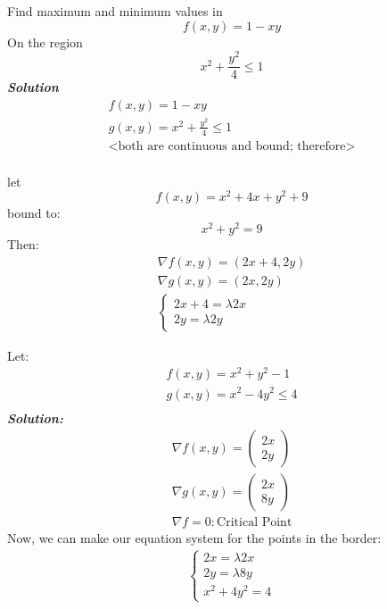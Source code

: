 \documentclass[11pt,fleqn]{book} %
\begin{document}
\begin{example}
    Find maximum and minimum values in $$f(x,y) = 1 - xy$$
    On the region $$x^2 + \frac{y^2}{4} \leq 1$$
    \textbf{\textit{Solution}}
    \begin{gather}
        f(x,y) = 1 - xy \\
        g(x,y) = x^2 + \frac{y^2}{4} \leq 1\\
        \text{<both are continuous and bound; therefore>}\\    
    \end{gather}
\end{example}
\begin{example}
    let $$f(x,y) = x^2 +4x +y^2 +9$$ bound to:
    $$x^2 + y^2 = 9$$
    Then:
    \begin{gather}
        \nabla f(x,y) = (2x+4, 2y)\\
        \nabla g(x,y) = (2x,2y)\\
        \begin{cases}
            2x+4 = \lambda 2x\\
            2y = \lambda 2y
        \end{cases}
    \end{gather}
\end{example}

\begin{example}
    Let:
    \begin{gather}
        f(x,y) = x^2 + y^2 - 1\\
        g(x,y) = x^2 - 4y^2 \leq 4\\
    \end{gather}
    \textit{\textbf{Solution:}}
    \begin{gather}
        \nabla f(x,y) = \begin{pmatrix}
            2x\\2y
        \end{pmatrix}
        \\ \nabla g(x,y) = \begin{pmatrix}
            2x \\ 8y
        \end{pmatrix}\\
        \nabla f = 0 : \text{Critical Point}
    \end{gather}
    Now, we can make our equation system for the points in the border:
    \begin{gather}
        \begin{cases}
            2x = \lambda 2x\\
            2y = \lambda 8y\\
            x^2 + 4y^2 = 4
        \end{cases}
    \end{gather}
\end{example}
\end{document}
